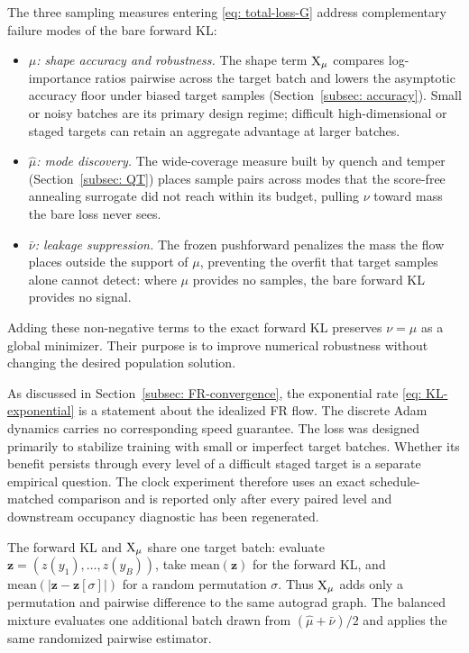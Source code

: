 \documentclass{article}
\begin{document}
The three sampling measures entering \eqref{eq: total-loss-G} address complementary failure modes of the bare forward KL:
\begin{itemize}
    \item \emph{$\mu$: shape accuracy and robustness.} The shape term $\mathrm{X}_\mu$ compares log-importance ratios pairwise across the target batch and lowers the asymptotic accuracy floor under biased target samples (Section~\ref{subsec: accuracy}). Small or noisy batches are its primary design regime; difficult high-dimensional or staged targets can retain an aggregate advantage at larger batches.
    \item \emph{$\hat\mu$: mode discovery.} The wide-coverage measure built by quench and temper (Section~\ref{subsec: QT}) places sample pairs across modes that the score-free annealing surrogate did not reach within its budget, pulling $\nu$ toward mass the bare loss never sees.
    \item \emph{$\bar\nu$: leakage suppression.} The frozen pushforward penalizes the mass the flow places outside the support of $\mu$, preventing the overfit that target samples alone cannot detect: where $\mu$ provides no samples, the bare forward KL provides no signal.
\end{itemize}
Adding these non-negative terms to the exact forward KL preserves $\nu=\mu$ as a global minimizer. Their purpose is to improve numerical robustness without changing the desired population solution.

\begin{remark}
\label{rem: robustness-not-speed}
As discussed in Section~\ref{subsec: FR-convergence}, the exponential rate \eqref{eq: KL-exponential} is a statement about the idealized FR flow. The discrete Adam dynamics carries no corresponding speed guarantee. The loss was designed primarily to stabilize training with small or imperfect target batches. Whether its benefit persists through every level of a difficult staged target is a separate empirical question. The clock experiment therefore uses an exact schedule-matched comparison and is reported only after every paired level and downstream occupancy diagnostic has been regenerated.
\end{remark}

The forward KL and $\mathrm{X}_\mu$ share one target batch: evaluate $\mathbf z = (z(y_1),\dots,z(y_B))$, take $\mathrm{mean}(\mathbf z)$ for the forward KL, and $\mathrm{mean}(|\mathbf z - \mathbf z[\sigma]|)$ for a random permutation $\sigma$. Thus $\mathrm{X}_\mu$ adds only a permutation and pairwise difference to the same autograd graph. The balanced mixture evaluates one additional batch drawn from $(\hat\mu+\bar\nu)/2$ and applies the same randomized pairwise estimator.
\end{document}
